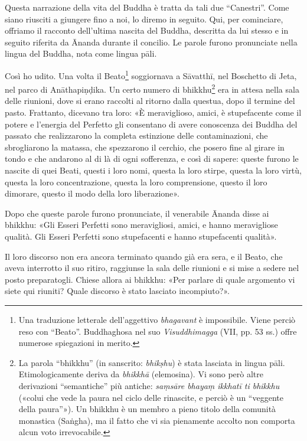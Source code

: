  Questa narrazione della vita del Buddha è tratta da
tali due “Canestri”. Come siano riusciti a giungere fino a noi, lo
diremo in seguito. Qui, per cominciare, offriamo il racconto dell’ultima
nascita del Buddha, descritta da lui stesso e in seguito riferita da
Ānanda durante il concilio. Le parole furono pronunciate nella lingua
del Buddha, nota come lingua pāli.


 Così ho udito. Una volta il
Beato\footnote{Una traduzione letterale dell’aggettivo \emph{bhagavant} è impossibile. Viene perciò reso con “Beato”. Buddhaghosa nel suo \emph{Visuddhimagga} (VII, pp. 53 ss.) offre numerose spiegazioni in merito.} soggiornava a Sāvatthī, nel Boschetto di Jeta,
nel parco di Anāthapiṇḍika. Un certo numero di
bhikkhu\footnote{La parola “bhikkhu” (in sanscrito: \emph{bhikṣhu}) è stata lasciata in lingua pāli. Etimologicamente deriva da \emph{bhikkhā} (elemosina). Vi sono però altre derivazioni “semantiche” più antiche: \emph{saṃsāre bhayaṃ ikkhatī ti bhikkhu} («colui che vede la paura nel ciclo delle rinascite, e perciò è un “veggente della paura”»). Un bhikkhu è un membro a pieno titolo della comunità monastica (Saṅgha), ma il fatto che vi sia pienamente accolto non comporta alcun voto irrevocabile.} era in attesa nella sala delle riunioni, dove
si erano raccolti al ritorno dalla questua, dopo il termine del pasto.
Frattanto, dicevano tra loro: «È meraviglioso, amici, è stupefacente
come il potere e l’energia del Perfetto gli consentano di avere
conoscenza dei Buddha del passato che realizzarono la completa
estinzione delle contaminazioni, che sbrogliarono la matassa, che
spezzarono il cerchio, che posero fine al girare in tondo e che andarono
al di là di ogni sofferenza, e così di sapere: queste furono le nascite
di quei Beati, questi i loro nomi, questa la loro stirpe, questa la loro
virtù, questa la loro concentrazione, questa la loro comprensione,
questo il loro dimorare, questo il modo della loro liberazione».


Dopo che queste parole furono pronunciate, il venerabile Ānanda disse ai
bhikkhu: «Gli Esseri Perfetti sono meravigliosi, amici, e hanno
meravigliose qualità. Gli Esseri Perfetti sono stupefacenti e hanno
stupefacenti qualità».


Il loro discorso non era ancora terminato quando già era sera, e il
Beato, che aveva interrotto il suo ritiro, raggiunse la sala delle
riunioni e si mise a sedere nel posto preparatogli. Chiese allora ai
bhikkhu: «Per parlare di quale argomento vi siete qui riuniti? Quale
discorso è stato lasciato incompiuto?».


